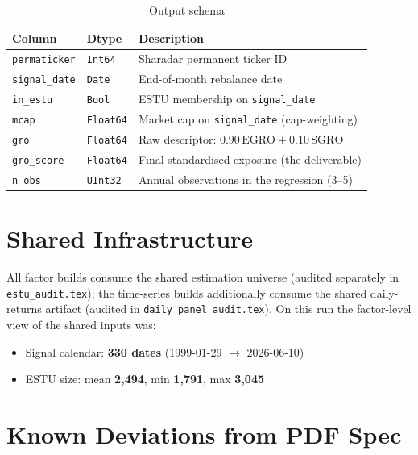 \documentclass[11pt,a4paper]{article}
\begin{document}
\begin{table}[h!]
\centering
\caption{Output schema}
\begin{tabular}{llp{7.4cm}}
\toprule
\textbf{Column} & \textbf{Dtype} & \textbf{Description} \\
\midrule
\texttt{permaticker} & \texttt{Int64} & Sharadar permanent ticker ID \\
\texttt{signal\_date} & \texttt{Date} & End-of-month rebalance date \\
\texttt{in\_estu} & \texttt{Bool} & ESTU membership on \texttt{signal\_date} \\
\texttt{mcap} & \texttt{Float64} & Market cap on \texttt{signal\_date} (cap-weighting) \\
\texttt{gro} & \texttt{Float64} & Raw descriptor: $0.90\,\mathrm{EGRO} + 0.10\,\mathrm{SGRO}$ \\
\texttt{gro\_score} & \texttt{Float64} & Final standardised exposure (the deliverable) \\
\texttt{n\_obs} & \texttt{UInt32} & Annual observations in the regression (3--5) \\
\bottomrule
\end{tabular}
\end{table}

\section{Shared Infrastructure}

All factor builds consume the shared estimation universe
 (audited separately in
\texttt{estu\_audit.tex}); the time-series builds additionally consume the
shared daily-returns artifact (audited in \texttt{daily\_panel\_audit.tex}).
On this run the factor-level view of the shared inputs was:

\begin{itemize}[leftmargin=*,topsep=2pt,itemsep=2pt]
  \item Signal calendar: \textbf{330 dates} (1999-01-29 $\to$ 2026-06-10)
  \item ESTU size: mean \textbf{2{,}494}, min \textbf{1{,}791}, max \textbf{3{,}045}
\end{itemize}

\section{Known Deviations from PDF Spec}
\end{document}
